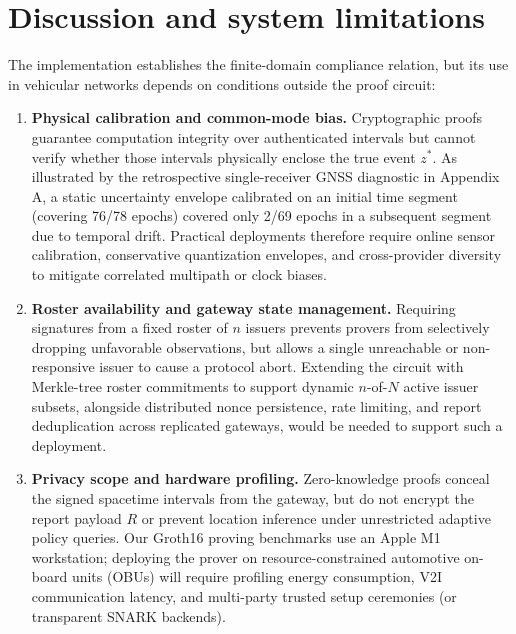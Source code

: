 \section{Discussion and system limitations}
The implementation establishes the finite-domain compliance relation, but its use in vehicular networks depends on conditions outside the proof circuit:
\begin{enumerate}
\item \textbf{Physical calibration and common-mode bias.} Cryptographic proofs guarantee computation integrity over authenticated intervals but cannot verify whether those intervals physically enclose the true event $z^*$. As illustrated by the retrospective single-receiver GNSS diagnostic in Appendix A, a static uncertainty envelope calibrated on an initial time segment (covering 76/78 epochs) covered only 2/69 epochs in a subsequent segment due to temporal drift. Practical deployments therefore require online sensor calibration, conservative quantization envelopes, and cross-provider diversity to mitigate correlated multipath or clock biases.


\item \textbf{Roster availability and gateway state management.} Requiring signatures from a fixed roster of $n$ issuers prevents provers from selectively dropping unfavorable observations, but allows a single unreachable or non-responsive issuer to cause a protocol abort. Extending the circuit with Merkle-tree roster commitments to support dynamic $n$-of-$N$ active issuer subsets, alongside distributed nonce persistence, rate limiting, and report deduplication across replicated gateways, would be needed to support such a deployment.


\item \textbf{Privacy scope and hardware profiling.} Zero-knowledge proofs conceal the signed spacetime intervals from the gateway, but do not encrypt the report payload $R$ or prevent location inference under unrestricted adaptive policy queries. Our Groth16 proving benchmarks use an Apple M1 workstation; deploying the prover on resource-constrained automotive on-board units (OBUs) will require profiling energy consumption, V2I communication latency, and multi-party trusted setup ceremonies (or transparent SNARK backends).
\end{enumerate}


